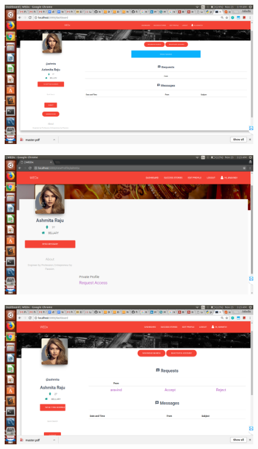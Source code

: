 \documentclass[12pt]{report}
\begin{document}
\begin{figure}[!htb]
    \centering
    \includegraphics[width=1\textwidth]{sc-9.png}
\end{figure}

\begin{figure}[!htb]
    \centering
    \includegraphics[width=1\textwidth]{sc-10.png}
\end{figure}

\begin{figure}[!htb]
    \centering
    \includegraphics[width=1\textwidth]{sc-11.png}
\end{figure}
\end{document}
